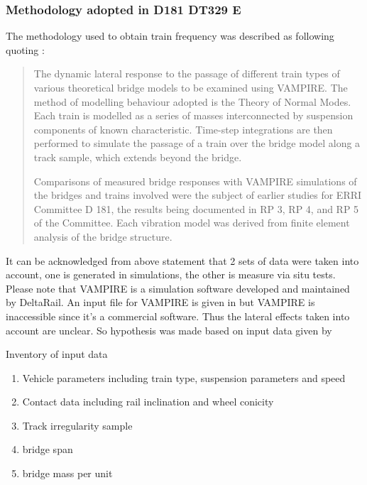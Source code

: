 \subsubsection{Methodology adopted in D181 DT329 E}
The methodology used to obtain train frequency was described as following quoting \cite[p.4]{d181dt329}:

\begin{quote}
The dynamic lateral response to the passage of different train types of various theoretical bridge models to be examined using VAMPIRE\cite{vampire}. The method of modelling behaviour adopted is the Theory of Normal Modes. Each train is modelled as a series of masses interconnected by suspension components of known characteristic. Time-step integrations are then performed to simulate the passage of a train over the bridge model along a track sample, which extends beyond the bridge.

Comparisons of measured bridge responses with VAMPIRE simulations of the bridges and trains involved were the subject of earlier studies for ERRI Committee D 181, the results being documented in RP 3, RP 4, and RP 5 of the Committee. Each vibration model was derived from finite element analysis of the bridge structure.
\end{quote}

It can be acknowledged from above statement that 2 sets of data were taken into account, one is generated in simulations, the other is measure via situ tests. Please note that VAMPIRE is a simulation software developed and maintained by DeltaRail. An input file for VAMPIRE is given in \cite{d181dt329} but VAMPIRE is inaccessible since it's a commercial software. Thus the lateral effects taken into account are unclear. So hypothesis was made based on input data given by \cite{d181dt329}

Inventory of input data
\begin{enumerate}[-]
    \item Vehicle parameters including train type, suspension parameters and speed
    \item Contact data including rail inclination and wheel conicity
    \item Track irregularity sample
    \item bridge span
    \item bridge mass per unit
\end{enumerate}

